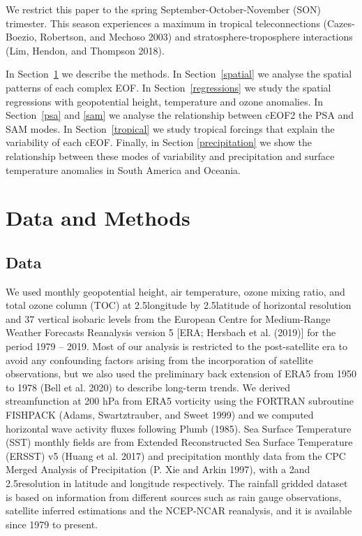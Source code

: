 \documentclass[smallextended]{svjour3}       %
\begin{document}
We restrict this paper to the spring September-October-November (SON) trimester. This season experiences a maximum in tropical teleconnections (Cazes-Boezio, Robertson, and Mechoso 2003) and stratosphere-troposphere interactions (Lim, Hendon, and Thompson 2018).

In Section~\ref{methods} we describe the methods.
In Section~\ref{spatial} we analyse the spatial patterns of each complex EOF.
In Section~\ref{regressions} we study the spatial regressions with geopotential height, temperature and ozone anomalies.
In Section~\ref{psa} and \ref{sam} we analyse the relationship between cEOF2 the PSA and SAM modes.
In Section~\ref{tropical} we study tropical forcings that explain the variability of each cEOF.
Finally, in Section \ref{precipitation} we show the relationship between these modes of variability and precipitation and surface temperature anomalies in South America and Oceania.

\hypertarget{methods}{%
\section{Data and Methods}\label{methods}}

\hypertarget{data}{%
\subsection{Data}\label{data}}

We used monthly geopotential height, air temperature, ozone mixing ratio, and total ozone column (TOC) at 2.5\degree longitude by 2.5\degree latitude of horizontal resolution and 37 vertical isobaric levels from the European Centre for Medium-Range Weather Forecasts Reanalysis version 5 {[}ERA; Hersbach et al. (2019){]} for the period 1979 -- 2019.
Most of our analysis is restricted to the post-satellite era to avoid any confounding factors arising from the incorporation of satellite observations, but we also used the preliminary back extension of ERA5 from 1950 to 1978 (Bell et al. 2020) to describe long-term trends.
We derived streamfunction at 200 hPa from ERA5 vorticity using the FORTRAN subroutine FISHPACK (Adams, Swartztrauber, and Sweet 1999) and we computed horizontal wave activity fluxes following Plumb (1985).
Sea Surface Temperature (SST) monthly fields are from Extended Reconstructed Sea Surface Temperature (ERSST) v5 (Huang et al. 2017) and precipitation monthly data from the CPC Merged Analysis of Precipitation (P. Xie and Arkin 1997), with a 2\degree and 2.5\degree resolution in latitude and longitude respectively.
The rainfall gridded dataset is based on information from different sources such as rain gauge observations, satellite inferred estimations and the NCEP-NCAR reanalysis, and it is available since 1979 to present.
\end{document}
